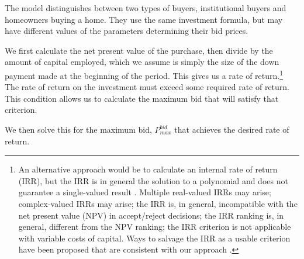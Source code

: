 {The model distinguishes between two types of buyers, institutional buyers and homeowners buying a home. They use the same investment formula, but may have different values of the parameters determining their bid prices.

We first calculate the net present value of the purchase, then divide by the amount of capital employed, which we assume is simply the size of the down payment made at the beginning of the period. This gives us a rate of return.\footnote{An alternative approach would be to calculate an \gls{internal rate of return} (IRR), but the IRR is in general the solution to a polynomial and does not guarantee a single-valued result \cite{robinsonOptimalTerminationIRR1996}. Multiple real-valued  IRRs may arise;  complex-valued IRRs may arise;  the IRR is, in general, incompatible with the \gls{net present value} (NPV) in accept/reject decisions; the IRR ranking is, in general, different from the NPV ranking; the IRR criterion is not applicable with variable costs of capital. Ways to salvage the IRR as a usable criterion have been proposed that are consistent with our approach \cite{magniAverageInternalRate2010}.} The rate of return on the investment must exceed some required rate of return. This condition allows us to calculate the maximum bid that will satisfy that criterion.}
We then solve this for the maximum bid, $P_{max}^{bid}$ that achieves the desired rate of return. 




